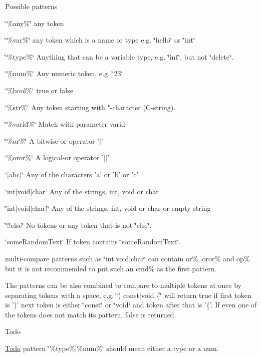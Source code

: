 Possible patterns
\begin{DoxyItemize}
\item \char`\"{}\%any\%\char`\"{} any token
\item \char`\"{}\%var\%\char`\"{} any token which is a name or type e.\-g. \char`\"{}hello\char`\"{} or \char`\"{}int\char`\"{}
\item \char`\"{}\%type\%\char`\"{} Anything that can be a variable type, e.\-g. \char`\"{}int\char`\"{}, but not \char`\"{}delete\char`\"{}.
\item \char`\"{}\%num\%\char`\"{} Any numeric token, e.\-g. \char`\"{}23\char`\"{}
\item \char`\"{}\%bool\%\char`\"{} true or false
\item \char`\"{}\%str\%\char`\"{} Any token starting with "-\/character (C-\/string).
\item \char`\"{}\%varid\%\char`\"{} Match with parameter varid
\item \char`\"{}\%or\%\char`\"{} A bitwise-\/or operator '$|$'
\item \char`\"{}\%oror\%\char`\"{} A logical-\/or operator '$|$$|$'
\item \char`\"{}\mbox{[}abc\mbox{]}\char`\"{} Any of the characters 'a' or 'b' or 'c'
\item \char`\"{}int$|$void$|$char\char`\"{} Any of the strings, int, void or char
\item \char`\"{}int$|$void$|$char$|$\char`\"{} Any of the strings, int, void or char or empty string
\item \char`\"{}!!else\char`\"{} No tokens or any token that is not \char`\"{}else\char`\"{}.
\item \char`\"{}some\-Random\-Text\char`\"{} If token contains \char`\"{}some\-Random\-Text\char`\"{}.
\end{DoxyItemize}

multi-\/compare patterns such as \char`\"{}int$|$void$|$char\char`\"{} can contain or\%, oror\% and op\% but it is not recommended to put such an cmd\% as the first pattern.

The patterns can be also combined to compare to multiple tokens at once by separating tokens with a space, e.\-g. \char`\"{}) const$|$void \{\char`\"{} will return true if first token is ')' next token is either \char`\"{}const\char`\"{} or \char`\"{}void\char`\"{} and token after that is '\{'. If even one of the tokens does not match its pattern, false is returned.

\begin{DoxyRefDesc}{Todo}
\item[\hyperlink{todo__todo000058}{Todo}]pattern \char`\"{}\%type\%$|$\%num\%\char`\"{} should mean either a type or a num.\end{DoxyRefDesc}



